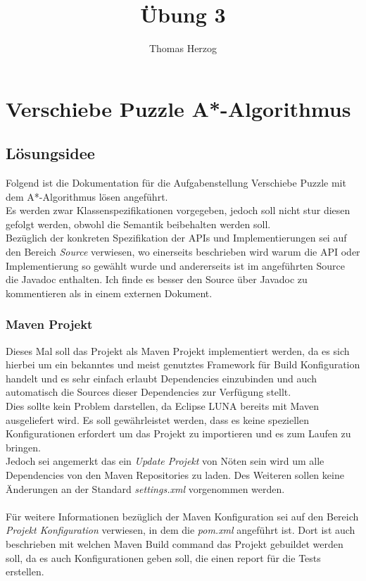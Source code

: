 \documentclass[11pt, a4paper, twoside]{article}   	%
\title{Übung 3}
\author{Thomas Herzog}
\newcommand{\ideaSection}{Lösungsidee}
\begin{document}
\setlength{\headheight}{15mm}

{\color{myred}
	\section
		{Verschiebe Puzzle A*-Algorithmus}
}

\subsection{\ideaSection}
Folgend ist die Dokumentation für die Aufgabenstellung Verschiebe Puzzle mit dem A*-Algorithmus lösen angeführt. \\
Es werden zwar Klassenspezifikationen vorgegeben, jedoch soll nicht stur diesen gefolgt werden, obwohl die Semantik beibehalten werden soll.\\
Bezüglich der konkreten Spezifikation der APIs und Implementierungen sei auf den Bereich \emph{Source} verwiesen, wo einerseits beschrieben wird warum die API oder Implementierung so gewählt wurde und andererseits ist im angeführten Source die Javadoc enthalten. Ich finde es besser den Source über Javadoc zu kommentieren als in einem externen Dokument.

\subsubsection{Maven Projekt}
Dieses Mal soll das Projekt als Maven Projekt implementiert werden, da es sich hierbei um ein bekanntes und meist genutztes Framework für Build Konfiguration handelt und es sehr einfach erlaubt Dependencies einzubinden und auch automatisch die Sources dieser Dependencies zur Verfügung stellt.\\
Dies sollte kein Problem darstellen, da Eclipse LUNA bereits mit Maven ausgeliefert wird. Es soll gewährleistet werden, dass es keine speziellen Konfigurationen erfordert um das Projekt zu importieren und es zum Laufen zu bringen.\\
Jedoch sei angemerkt das ein \emph{Update Projekt} von Nöten sein wird um alle Dependencies von den Maven Repositories zu laden. Des Weiteren sollen keine Änderungen an der Standard \emph{settings.xml} vorgenommen werden.\\\\
Für weitere Informationen bezüglich der Maven Konfiguration sei auf den Bereich \emph{Projekt Konfiguration} verwiesen, in dem die \emph{pom.xml} angeführt ist. Dort ist auch beschrieben mit welchen Maven Build command das Projekt gebuildet werden soll, da es auch Konfigurationen geben soll, die einen report für die Tests erstellen. 
\end{document}
